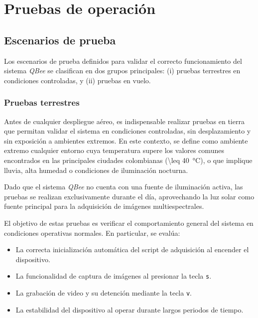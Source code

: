 \section{Pruebas de operación}
  
  
  \subsection{Escenarios de prueba}
    Los escenarios de prueba definidos para validar el correcto funcionamiento del sistema \textit{QBee} se clasifican en dos grupos principales: (i) pruebas terrestres en condiciones controladas, y (ii) pruebas en vuelo.

    \subsubsection{Pruebas terrestres}
    
        Antes de cualquier despliegue aéreo, es indispensable realizar pruebas en tierra que permitan validar el sistema en condiciones controladas, sin desplazamiento y sin exposición a ambientes extremos. En este contexto, se define como ambiente extremo cualquier entorno cuya temperatura supere los valores comunes encontrados en las principales ciudades colombianas (\SI{\leq 40}{\celsius}), o que implique lluvia, alta humedad o condiciones de iluminación nocturna.
        
        \noindent Dado que el sistema \textit{QBee} no cuenta con una fuente de iluminación activa, las pruebas se realizan exclusivamente durante el día, aprovechando la luz solar como fuente principal para la adquisición de imágenes multiespectrales.
        
        \noindent El objetivo de estas pruebas es verificar el comportamiento general del sistema en condiciones operativas normales. En particular, se evalúa:
        
        \begin{itemize}
        \item La correcta inicialización automática del script de adquisición al encender el dispositivo.
        \item La funcionalidad de captura de imágenes al presionar la tecla \texttt{s}.
        \item La grabación de video y su detención mediante la tecla \texttt{v}.
        \item La estabilidad del dispositivo al operar durante largos periodos de tiempo.
        \end{itemize}
        
